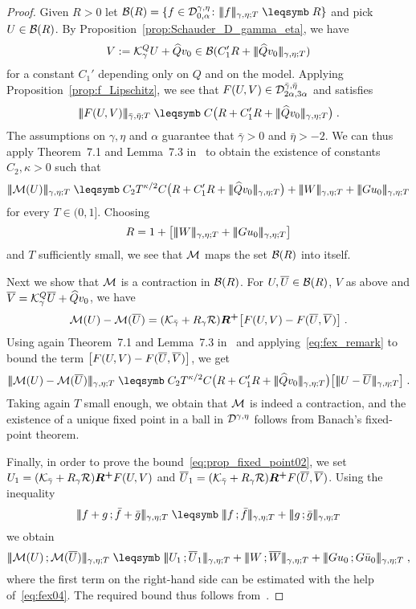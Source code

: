 \documentclass[reqno,11pt]{article}
\def\Rplus{\boldsymbol{R^+}}
\def\normDgamma#1{|\!|\!|#1|\!|\!|}
\def\seminormff#1#2{|\!|\!|#1\,\mathord{;}\,#2|\!|\!|}
\begin{document}
\begin{proof}
Given $R>0$ let $\cB(R) = \setsuch{f\in\cD^{\gamma,\eta}_{0,\alpha}}
{\normDgamma{f}_{\gamma,\eta;T}\leqs R}$ and pick $U\in{\mathcal B}(R)$. 
By Proposition~\ref{prop:Schauder_D_gamma_eta},
we have 
\[
V := \cK^Q_\gamma U + \widehat Qv_0 
\in\cB(C_1'R+\normDgamma{\widehat Qv_0}_{\gamma,\eta;T}) 
\]
for a constant $C_1'$ depending only on $Q$ and on the model. 
Applying Proposition~\ref{prop:f_Lipschitz}, we see that 
$F(U,V)\in{\mathcal D}^{\bar\gamma,\bar\eta}_{2\alpha,3\alpha}$ and satisfies 
\[
 \normDgamma{F(U,V)}_{\bar\gamma,\bar\eta;T}
 \leqs C\bigpar{R + C_1'R+\normDgamma{\widehat Qv_0}_{\gamma,\eta;T}}\;.
\]
The assumptions on $\gamma, \eta$ and $\alpha$ guarantee that $\bar\gamma>0$ and
$\bar\eta>-2$. We can thus apply Theorem~7.1 and Lemma~7.3 in~\cite{Hairer2014}
to obtain the existence of constants $C_2, \kappa>0$ such that 
\[
 \normDgamma{\cM(U)}_{\gamma,\eta;T} \leqs C_2T^{\kappa/2}
C\bigpar{R + C_1'R+\normDgamma{\widehat Qv_0}_{\gamma,\eta;T}} +
\normDgamma{W}_{\gamma,\eta;T} + 
\normDgamma{Gu_0}_{\gamma,\eta;T}
\]
for every $T\in(0,1]$. Choosing 
\[
R=1+\bigbrak{\normDgamma{W}_{\gamma,\eta;T} +
\normDgamma{Gu_0}_{\gamma,\eta;T}} 
\]
and $T$ sufficiently small, we see that
${\mathcal M}$ maps the set ${\mathcal B}(R)$ into itself. 

Next we show that ${\mathcal M}$ is a contraction in ${\mathcal B}(R)$. For
$U,\overline U\in{\mathcal B}(R)$, $V$ as above and $\overline{V}={\mathcal K}^Q_\gamma \overline
U + \widehat Qv_0$, we have 
\[
 \cM(U) - \cM(\overline U) = 
 (\cK_{\bar\gamma}+R_\gamma\cR)\Rplus 
 \bigbrak{F(U,V) - F(\overline U,\overline V)}\;.
\]
Using again Theorem~7.1 and Lemma~7.3 in~\cite{Hairer2014} and
applying~\eqref{eq:fex_remark} to bound the term $\bigl[F(U,V) - F(\overline
U,\overline V)\bigr]$, we get 
\[
 \normDgamma{\cM(U) - \cM(\overline U)}_{\gamma,\eta;T} \leqs
C_2T^{\kappa/2} C\bigpar{R + C_1'R+\normDgamma{\widehat Qv_0}_{\gamma,\eta;T}}
\bigbrak{\normDgamma{U - \overline U}_{\gamma,\eta;T}}\;.
\]
Taking again $T$ small enough, we obtain that ${\mathcal M}$ is indeed a contraction, and
the existence of a unique fixed point in a ball in ${\mathcal D}^{\gamma,\eta}$ follows
from Banach's fixed-point theorem.

Finally, in order to prove the bound~\eqref{eq:prop_fixed_point02},  
we set $U_1 = (\cK_{\bar\gamma}+R_\gamma\cR) \Rplus F(U,V)$ and $\overline
U_1 = (\cK_{\bar\gamma}+R_\gamma\cR) \Rplus F(\overline U,\overline V)$. 
Using the inequality 
\[
\seminormff{f+g}{\bar f+\bar g}_{\gamma,\eta;T} \leqs
\seminormff{f}{\bar f}_{\gamma,\eta;T} + \seminormff{g}{\bar g}_{\gamma,\eta;T}
\] 
we obtain
\[
 \seminormff{\cM(U)}{\cM(\overline U)}_{\gamma,\eta;T} 
 \leqs \seminormff{U_1}{\overline U_1}_{\gamma,\eta;T} 
 + \seminormff{W}{\overline W}_{\gamma,\eta;T} 
 + \seminormff{Gu_0}{G\bar u_0}_{\gamma,\eta;T}\;,
\]
where the first term on the right-hand side can be estimated with the help
of~\eqref{eq:fex04}. The required bound thus follows from~\cite[Thm.~7.1 and
Lemma~7.3]{Hairer2014}.
\end{proof}
\end{document}
